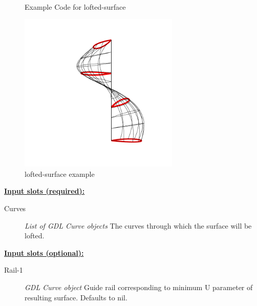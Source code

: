 \documentclass [11pt]{book}
\begin{document}
\begin{itemize}
\begin{figure}
\begin{lrbox}{\boxedverb}
\begin{minipage}{\linewidth}
{\begin{verbatim}
 
\end{verbatim}}
\end{minipage}
\end{lrbox}
\fbox{\usebox{\boxedverb}}

\caption{Example Code for lofted-surface}

\label{fig:example-code-lofted-surface}

\end{figure}

\begin{figure}
\begin{center}
\includegraphics[width=3in,height=3in]{../images/example-lofted-surface.pdf}
\end{center}

\caption{lofted-surface example}

\label{fig:lofted-surface}

\end{figure}





\textbf{
\underline{Input slots (required):}}

\begin{description}

\item [Curves]
\emph{List of GDL Curve objects} The curves through which the surface will be lofted.


\end{description}






\textbf{
\underline{Input slots (optional):}}

\begin{description}

\item [Rail-1]
\emph{GDL Curve object} Guide rail corresponding to minimum U parameter of
resulting surface. Defaults to nil.



\end{description}
\end{itemize}
\end{document}

